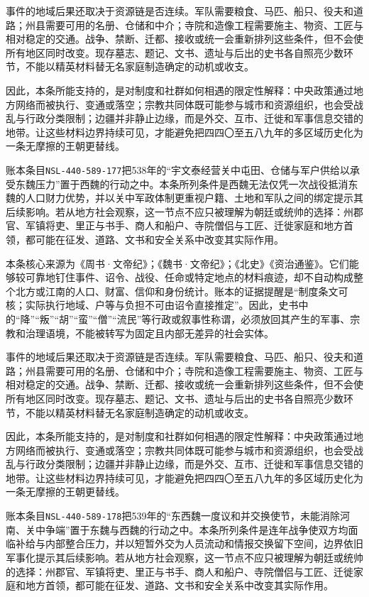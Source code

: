 事件的地域后果还取决于资源链是否连续。军队需要粮食、马匹、船只、役夫和道路；州县需要可用的名册、仓储和中介；寺院和造像工程需要施主、物资、工匠与相对稳定的交通。战争、禁断、迁都、接收或统一会重新排列这些条件，但不会使所有地区同时改变。现存墓志、题记、文书、遗址与后出的史书各自照亮少数环节，不能以精英材料替无名家庭制造确定的动机或收支。

因此，本条所能支持的，是对制度和社群如何相遇的限定性解释：中央政策通过地方网络而被执行、变通或落空；宗教共同体既可能参与城市和资源组织，也会受战乱与行政分类限制；边疆并非静止边缘，而是外交、互市、迁徙和军事信息交错的地带。让这些材料边界持续可见，才能避免把四四〇至五八九年的多区域历史化为一条无摩擦的王朝更替线。

账本条目\texttt{NSL-440-589-177}把538年的“宇文泰经营关中屯田、仓储与军户供给以承受东魏压力”置于西魏的行动之中。本条所列条件是西魏无法仅凭一次战役抵消东魏的人口财力优势，并以关中军政体制更重视户籍、土地和军队之间的绑定提示其后续影响。若从地方社会观察，这一节点不应只被理解为朝廷或统帅的选择：州郡官、军镇将吏、里正与书手、商人和船户、寺院僧侣与工匠、迁徙家庭和地方首领，都可能在征发、道路、文书和安全关系中改变其实际作用。

本条核心来源为《周书·文帝纪》；《魏书·文帝纪》；《北史》《资治通鉴》。它们能够较可靠地钉住事件、诏令、战役、任命或特定地点的材料痕迹，却不自动构成整个北方或江南的人口、财富、信仰和身份统计。账本的证据提醒是“制度条文可核；实际执行地域、户等与负担不可由诏令直接推定”。因此，史书中的“降”“叛”“胡”“蛮”“僧”“流民”等行政或叙事性称谓，必须放回其产生的军事、宗教和治理语境，不能被转写为固定且内部无差异的社会实体。

事件的地域后果还取决于资源链是否连续。军队需要粮食、马匹、船只、役夫和道路；州县需要可用的名册、仓储和中介；寺院和造像工程需要施主、物资、工匠与相对稳定的交通。战争、禁断、迁都、接收或统一会重新排列这些条件，但不会使所有地区同时改变。现存墓志、题记、文书、遗址与后出的史书各自照亮少数环节，不能以精英材料替无名家庭制造确定的动机或收支。

因此，本条所能支持的，是对制度和社群如何相遇的限定性解释：中央政策通过地方网络而被执行、变通或落空；宗教共同体既可能参与城市和资源组织，也会受战乱与行政分类限制；边疆并非静止边缘，而是外交、互市、迁徙和军事信息交错的地带。让这些材料边界持续可见，才能避免把四四〇至五八九年的多区域历史化为一条无摩擦的王朝更替线。

账本条目\texttt{NSL-440-589-178}把539年的“东西魏一度议和并交换使节，未能消除河南、关中争端”置于东魏与西魏的行动之中。本条所列条件是连年战争使双方均面临补给与内部整合压力，并以短暂外交为人员流动和情报交换留下空间，边界依旧军事化提示其后续影响。若从地方社会观察，这一节点不应只被理解为朝廷或统帅的选择：州郡官、军镇将吏、里正与书手、商人和船户、寺院僧侣与工匠、迁徙家庭和地方首领，都可能在征发、道路、文书和安全关系中改变其实际作用。

